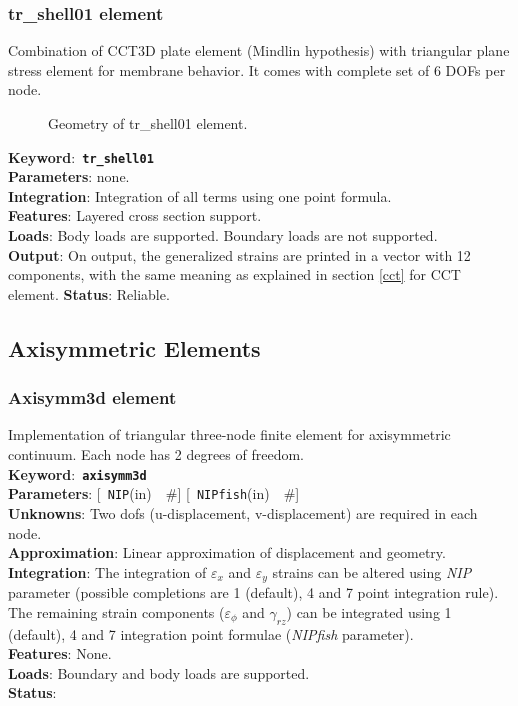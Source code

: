 \documentclass[a4paper]{article}
\newcommand{\descitem}[1]{{\noindent \bf #1}:}
\newcommand{\elemkeyword}[1]{\descitem{Keyword}~{\bf \texttt{#1}}}
\newcommand{\elemparam}[2]{{{\texttt{#1}\tiny (#2)}~~\#}}
\newcommand{\optelemparam}[2]{{[~\elemparam{#1}{#2}]}}
\newcommand{\param}[1]{{\em #1}}
\begin{document}
\subsubsection {tr\_shell01 element}
Combination of CCT3D plate element (Mindlin hypothesis) with triangular plane stress element
for membrane behavior. It comes with complete set of 6 DOFs per node.
\begin{figure}[tb]
 \centering
 \begin{makeimage}
  
 \end{makeimage}
 \caption{Geometry of tr\_shell01 element.}
\end{figure}

\elemkeyword{tr\_shell01}\\
\descitem{Parameters} none.\\
\descitem{Integration}
Integration of all terms using one point formula.\\
\descitem{Features} Layered cross section support.\\
\descitem{Loads} Body loads are supported. Boundary loads are
not supported.\\
\descitem{Output} On output, the generalized strains are printed in a vector with 12 components, with the same meaning as explained in section \ref{cct} for CCT element.
\descitem{Status} Reliable.


\subsection{Axisymmetric Elements}
\subsubsection{Axisymm3d element}
Implementation of triangular three-node finite element 
for axisymmetric continuum. Each node has 2 degrees of freedom.\\
\elemkeyword{axisymm3d}\\
\descitem{Parameters} \optelemparam{NIP}{in} \optelemparam{NIPfish}{in}\\
\descitem{Unknowns}
Two dofs (u-displacement, v-displacement) are required in each node.\\
\descitem{Approximation} Linear approximation of displacement and
geometry.\\
\descitem{Integration}
The integration of $\varepsilon_x$ and $\varepsilon_y$ strains can be altered using
\param{NIP} parameter (possible completions are 1 (default), 4 and 7
point integration rule). The remaining strain components ($\varepsilon_\phi$ and
$\gamma_{rz}$) can be integrated using 1 (default), 4 and 7 integration
point formulae (\param{NIPfish} parameter).\\
\descitem{Features} None.\\
\descitem{Loads} Boundary and body loads are supported.\\
\descitem{Status} 
\end{document}
